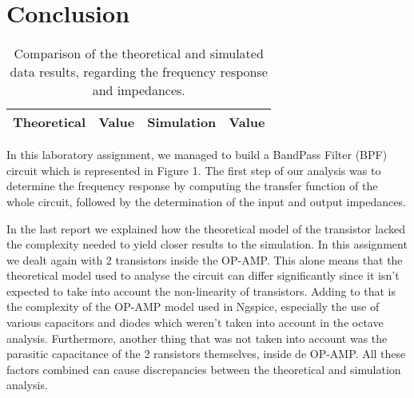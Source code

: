 \section{Conclusion}
\label{sec:conclusion}
\par
\begin{table}[!h]
  \centering
  \begin{tabular}{c c c c}
    \hline    
    {\bf Theoretical} & {\bf Value} & {\bf Simulation} & {\bf Value}\\ \hline
     
  \end{tabular}
  \caption{Comparison of the theoretical and simulated data results, regarding the frequency response and impedances.}
  \label{tab:comp}
\end{table}

In this laboratory assignment, we managed to build a BandPass Filter (BPF) circuit which is represented in Figure 1. The first step of our analysis was to determine the frequency response by computing the transfer function of the whole circuit, followed by the determination of the input and output impedances.

In the last report we explained how the theoretical model of the transistor lacked the complexity needed to yield closer results to the simulation. In this assignment we dealt again with 2 transistors inside the OP-AMP. This alone means that the theoretical model used to analyse the circuit can differ significantly since it isn't expected to take into account the non-linearity of transistors. Adding to that is the complexity of the OP-AMP model used in Ngspice, especially the use of various capacitors and diodes which weren't taken into account in the octave analysis. Furthermore, another thing that was not taken into account was the parasitic capacitance of the 2 ransistors themselves, inside de OP-AMP. All these factors combined can cause discrepancies between the theoretical and simulation analysis.

